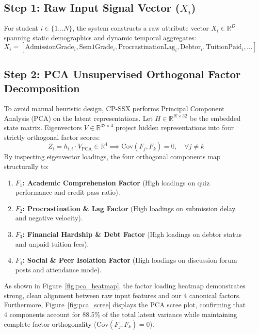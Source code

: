 \documentclass[11pt, a4paper]{article}
\begin{document}
\subsection{Step 1: Raw Input Signal Vector \texorpdfstring{($X_i$)}{(Xi)}}
For student $i \in \{1 \dots N\}$, the system constructs a raw attribute vector $X_i \in \mathbb{R}^{D}$ spanning static demographics and dynamic temporal aggregates:
\begin{equation}
    X_i = [\text{AdmissionGrade}_i, \text{Sem1Grade}_i, \text{ProcrastinationLag}_i, \text{Debtor}_i, \text{TuitionPaid}_i, \dots]
\end{equation}

\subsection{Step 2: PCA Unsupervised Orthogonal Factor Decomposition}
To avoid manual heuristic design, CP-SSX performs Principal Component Analysis (PCA) on the latent representations. Let $H \in \mathbb{R}^{N \times 32}$ be the embedded state matrix. Eigenvectors $V \in \mathbb{R}^{32 \times 4}$ project hidden representations into four strictly orthogonal factor scores:
\begin{equation}
    Z_i = h_{i,t} \cdot V_{\text{PCA}} \in \mathbb{R}^4 \implies \text{Cov}(F_j, F_k) = 0, \quad \forall j \neq k
\end{equation}
By inspecting eigenvector loadings, the four orthogonal components map structurally to:
\begin{enumerate}
    \item \textbf{$F_1$: Academic Comprehension Factor} (High loadings on quiz performance and credit pass ratio).
    \item \textbf{$F_2$: Procrastination \& Lag Factor} (High loadings on submission delay and negative velocity).
    \item \textbf{$F_3$: Financial Hardship \& Debt Factor} (High loadings on debtor status and unpaid tuition fees).
    \item \textbf{$F_4$: Social \& Peer Isolation Factor} (High loadings on discussion forum posts and attendance mode).
\end{enumerate}

As shown in Figure~\ref{fig:pca_heatmap}, the factor loading heatmap demonstrates strong, clean alignment between raw input features and our 4 canonical factors. Furthermore, Figure~\ref{fig:pca_scree} displays the PCA scree plot, confirming that 4 components account for 88.5\% of the total latent variance while maintaining complete factor orthogonality ($\text{Cov}(F_j, F_k) = 0$).
\end{document}

